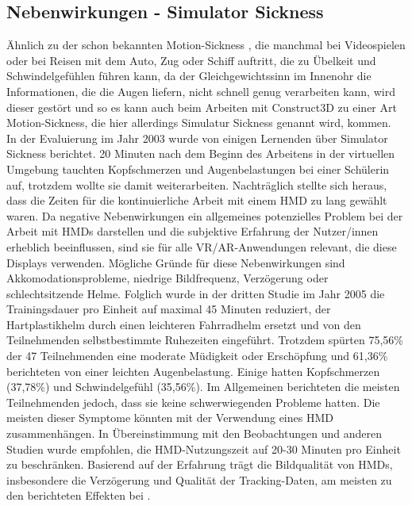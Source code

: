 \documentclass[deutsch]{llncs}
\begin{document}
\subsection{Nebenwirkungen - Simulator Sickness}
Ähnlich zu der schon bekannten Motion-Sickness \cite{motionsickness}, die manchmal bei Videospielen oder bei Reisen mit dem Auto, Zug oder Schiff auftritt, die zu Übelkeit und Schwindelgefühlen führen kann, da der Gleichgewichtssinn im Innenohr die Informationen, die die Augen liefern, nicht schnell genug verarbeiten kann, wird dieser gestört und so es kann auch beim Arbeiten mit Construct3D zu einer Art Motion-Sickness, die hier allerdings
Simulatur Sickness genannt wird, kommen.
\noindent \\
In der Evaluierung im Jahr 2003 wurde von einigen Lernenden über Simulator Sickness berichtet. 20 Minuten nach dem Beginn des Arbeitens in der virtuellen Umgebung tauchten Kopfschmerzen und Augenbelastungen bei einer Schülerin auf, trotzdem wollte sie damit weiterarbeiten. Nachträglich stellte sich heraus, dass die Zeiten für die kontinuierliche Arbeit mit einem HMD zu lang gewählt waren. Da negative Nebenwirkungen ein allgemeines potenzielles Problem bei der Arbeit mit HMDs darstellen und die subjektive Erfahrung der Nutzer/innen erheblich beeinflussen, sind sie für alle VR/AR-Anwendungen relevant, die diese Displays verwenden. Mögliche Gründe für diese Nebenwirkungen sind Akkomodationsprobleme, niedrige Bildfrequenz, Verzögerung oder schlechtsitzende Helme. 
Folglich wurde in der dritten Studie im Jahr 2005 die Trainingsdauer pro Einheit auf maximal 45 Minuten reduziert, der Hartplastikhelm durch einen leichteren Fahrradhelm ersetzt und von den Teilnehmenden selbstbestimmte Ruhezeiten eingeführt. Trotzdem spürten 75,56\% der 47 Teilnehmenden eine moderate Müdigkeit oder Erschöpfung und 61,36\% berichteten von einer leichten Augenbelastung. Einige hatten Kopfschmerzen (37,78\%) und Schwindelgefühl (35,56\%). Im Allgemeinen berichteten die meisten Teilnehmenden jedoch, dass sie keine schwerwiegenden Probleme hatten. Die meisten dieser Symptome könnten mit der Verwendung eines HMD zusammenhängen. In Übereinstimmung mit den Beobachtungen und anderen Studien wurde empfohlen, die HMD-Nutzungszeit auf 20-30 Minuten pro Einheit zu beschränken.  Basierend auf der Erfahrung trägt die Bildqualität von HMDs, insbesondere die Verzögerung und Qualität der Tracking-Daten, am meisten zu den berichteten Effekten bei \cite{Kaufmann_summaryof}.
\end{document}
